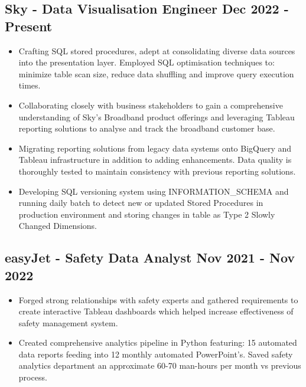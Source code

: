 \documentclass[a4paper,9pt]{article}
\begin{document}
\subsection*{\textbf{Sky - Data Visualisation Engineer} \hfill  Dec 2022 - Present}
\begin{itemize}[noitemsep]
    \item Crafting SQL stored procedures, adept at consolidating diverse data sources into the presentation layer. Employed SQL optimisation techniques to: minimize table scan size, reduce data shuffling and improve query execution times.
    \item Collaborating closely with business stakeholders to gain a comprehensive understanding of Sky's Broadband product offerings and leveraging Tableau reporting solutions to analyse and track the broadband customer base.
    \item Migrating reporting solutions from legacy data systems onto BigQuery and Tableau infrastructure in addition to adding enhancements. Data quality is thoroughly tested to maintain consistency with previous reporting solutions.
    \item Developing SQL versioning system using INFORMATION\_SCHEMA and running daily batch to detect new or updated Stored Procedures in production environment and storing changes in table as Type 2 Slowly Changed Dimensions.
\end{itemize}

\subsection*{\textbf{easyJet - Safety Data Analyst} \hfill  Nov 2021 - Nov 2022}
\begin{itemize}[noitemsep]
    \item Forged strong relationships with safety experts and gathered requirements to create interactive Tableau dashboards which helped increase effectiveness of safety management system.
    \item Created comprehensive analytics pipeline in Python featuring: 15 automated data reports feeding into 12 monthly automated PowerPoint's. Saved safety analytics department an approximate 60-70 man-hours per month vs previous process.
\end{itemize}
\end{document}
